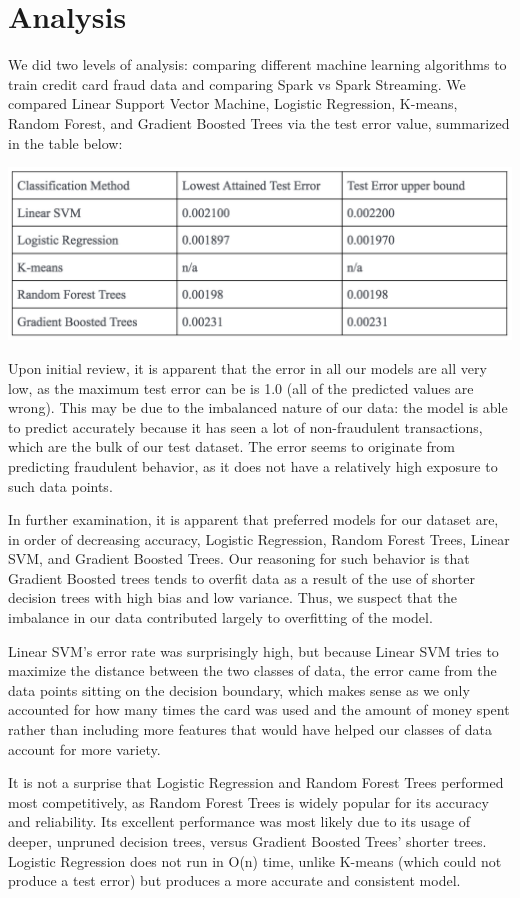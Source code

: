 \documentclass[9pt,twocolumn,twoside]{idsi}
\begin{document}
\section{Analysis}
We did two levels of analysis: comparing different machine learning algorithms to train credit card fraud data and comparing Spark vs Spark Streaming. We compared Linear Support Vector Machine, Logistic Regression, K-means, Random Forest, and Gradient Boosted Trees via the test error value, summarized in the table below:

\includegraphics[scale=0.4]{three.png}

Upon initial review, it is apparent that the error in all our models are all very low, as the maximum test error can be is 1.0 (all of the predicted values are wrong). This may be due to the imbalanced nature of our data: the model is able to predict accurately because it has seen a lot of non-fraudulent transactions, which are the bulk of our test dataset. The error seems to originate from predicting fraudulent behavior, as it does not have a relatively high exposure to such data points. 

In further examination, it is apparent that preferred models for our dataset are, in order of decreasing accuracy, Logistic Regression, Random Forest Trees, Linear SVM, and Gradient Boosted Trees. Our reasoning for such behavior is that Gradient Boosted trees tends to overfit data as a result of the use of shorter decision trees with high bias and low variance. Thus, we suspect that the imbalance in our data contributed largely to overfitting of the model.

Linear SVM’s error rate was surprisingly high, but because Linear SVM tries to maximize the distance between the two classes of data, the error came from the data points sitting on the decision boundary, which makes sense as we only accounted for how many times the card was used and the amount of money spent rather than including more features that would have helped our classes of data account for more variety. 

It is not a surprise that Logistic Regression and Random Forest Trees performed most competitively, as Random Forest Trees is widely popular for its accuracy and reliability. Its excellent performance was most likely due to its usage of deeper, unpruned decision trees, versus Gradient Boosted Trees’ shorter trees. Logistic Regression does not run in O(n) time, unlike K-means (which could not produce a test error) but produces a more accurate and consistent model. 
\end{document}
